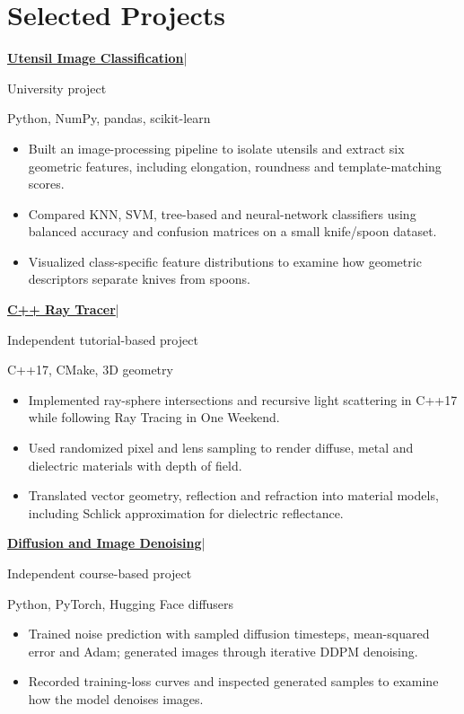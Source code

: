 \documentclass[11pt,a4paper]{article}
\newcommand{\entry}[2]{\textbf{#1}\enspace|\enspace{\small #2}\par}
\begin{document}
\section{Selected Projects}
\entry{\href{https://github.com/Javpato/Data-Science-Spoon-knives}{Utensil Image Classification}}{2026}
{\small University project}\par
{\small Python, NumPy, pandas, scikit-learn}\par
\begin{itemize}
\item Built an image-processing pipeline to isolate utensils and extract six geometric features, including elongation, roundness and template-matching scores.
\item Compared KNN, SVM, tree-based and neural-network classifiers using balanced accuracy and confusion matrices on a small knife/spoon dataset.
\item Visualized class-specific feature distributions to examine how geometric descriptors separate knives from spoons.
\end{itemize}
\entry{\href{https://github.com/Javpato/RayTracingProject}{C++ Ray Tracer}}{2025}
{\small Independent tutorial-based project}\par
{\small C++17, CMake, 3D geometry}\par
\begin{itemize}
\item Implemented ray-sphere intersections and recursive light scattering in C++17 while following Ray Tracing in One Weekend.
\item Used randomized pixel and lens sampling to render diffuse, metal and dielectric materials with depth of field.
\item Translated vector geometry, reflection and refraction into material models, including Schlick approximation for dielectric reflectance.
\end{itemize}
\entry{\href{https://github.com/Javpato/diffusion-model}{Diffusion and Image Denoising}}{2026}
{\small Independent course-based project}\par
{\small Python, PyTorch, Hugging Face diffusers}\par
\begin{itemize}
\item Trained noise prediction with sampled diffusion timesteps, mean-squared error and Adam; generated images through iterative DDPM denoising.
\item Recorded training-loss curves and inspected generated samples to examine how the model denoises images.
\end{itemize}
\end{document}
